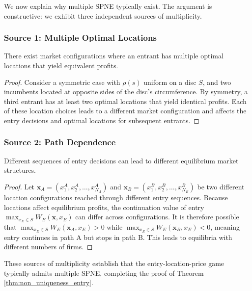 \documentclass{article}
\begin{document}
We now explain why multiple SPNE typically exist. The argument is constructive: we exhibit three independent sources of multiplicity.

\subsubsection*{Source 1: Multiple Optimal Locations}

\begin{lemma}
  There exist market configurations where an entrant has multiple optimal locations that yield equivalent profits.
\end{lemma}

\begin{proof}
  Consider a symmetric case with $\rho(s)$ uniform on a disc $S$, and two incumbents located at opposite sides of the disc's circumference. By symmetry, a third entrant has at least two optimal locations that yield identical profits. Each of these location choices leads to a different market configuration and affects the entry decisions and optimal locations for subsequent entrants.
\end{proof}

\subsubsection*{Source 2: Path Dependence}

\begin{lemma}
  Different sequences of entry decisions can lead to different equilibrium market structures.
\end{lemma}

\begin{proof}
  Let $\mathbf{x}_A = (x_1^A, x_2^A, \ldots, x_{N_A}^A)$ and $\mathbf{x}_B = (x_1^B, x_2^B, \ldots, x_{N_B}^B)$ be two different location configurations reached through different entry sequences. Because locations affect equilibrium profits, the continuation value of entry $\max_{x_E\in S} W_E(\mathbf{x},x_E)$ can differ across configurations. It is therefore possible that $\max_{x_E\in S} W_E(\mathbf{x}_A,x_E) > 0$ while $\max_{x_E\in S} W_E(\mathbf{x}_B,x_E) < 0$, meaning entry continues in path A but stops in path B. This leads to equilibria with different numbers of firms.
\end{proof}

These sources of multiplicity establish that the entry-location-price game typically admits multiple SPNE, completing the proof of Theorem \ref{thm:non_uniqueness_entry}.
\end{document}
